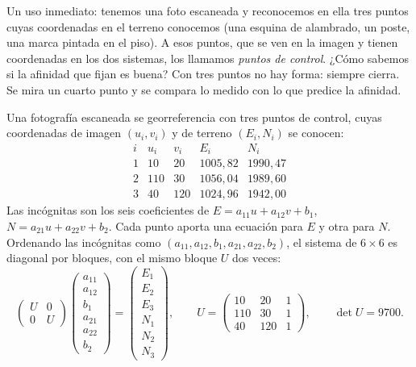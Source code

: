 Un uso inmediato: tenemos una foto escaneada y reconocemos en ella tres puntos cuyas
coordenadas en el terreno conocemos (una esquina de alambrado, un poste, una marca pintada en el piso). A
esos puntos, que se ven en la imagen y tienen coordenadas en los dos sistemas, los llamamos
\emph{puntos de control}. ¿Cómo sabemos si la afinidad que fijan es buena? Con tres puntos no
hay forma: siempre cierra. Se mira un cuarto punto y se compara lo medido con lo que predice la
afinidad.

\begin{ejemplo}\label{ej:06-tres-puntos}
Una fotografía escaneada se georreferencia con tres puntos de control, cuyas coordenadas de
imagen \((u_i,v_i)\) y de terreno \((E_i,N_i)\) se conocen:
\[
\begin{array}{c|cc|cc}
i & u_i & v_i & E_i & N_i\\ \hline
1 & 10 & 20 & 1005{,}82 & 1990{,}47\\
2 & 110 & 30 & 1056{,}04 & 1989{,}60\\
3 & 40 & 120 & 1024{,}96 & 1942{,}00
\end{array}
\]
Las incógnitas son los seis coeficientes de
\(E=a_{11}u+a_{12}v+b_1\), \(N=a_{21}u+a_{22}v+b_2\). Cada punto aporta una ecuación para \(E\)
y otra para \(N\). Ordenando las incógnitas como \((a_{11},a_{12},b_1,a_{21},a_{22},b_2)\), el
sistema de \(6\times6\) es diagonal por bloques, con el mismo bloque \(U\) dos veces:
\[
  \begin{pmatrix}U&0\\0&U\end{pmatrix}
  \begin{pmatrix}a_{11}\\a_{12}\\b_1\\a_{21}\\a_{22}\\b_2\end{pmatrix}
  =\begin{pmatrix}E_1\\E_2\\E_3\\N_1\\N_2\\N_3\end{pmatrix},
  \qquad
  U=\begin{pmatrix}10&20&1\\110&30&1\\40&120&1\end{pmatrix},
  \qquad \det U=9700 .
\]
\end{ejemplo}
